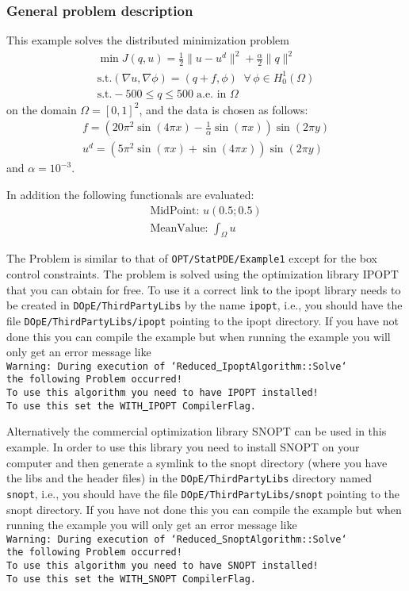 \subsubsection{General problem description}
This example solves the distributed minimization problem
\begin{gather*}
\min J(q,u) = \frac{1}{2} \|u-u^d\|^2 + \frac{\alpha}{2}\|q\|^2\\
\text{s.t.} (\nabla u,\nabla \phi) = (q+f,\phi)\;\;\forall\,\phi \in H^1_0(\Omega)\\
\text{s.t.} -500 \le q \le 500\;\text{a.e. in }\Omega
\end{gather*}
on the domain $\Omega = [0,1]^2$, and the data is chosen as follows:
\begin{gather*}
 f = \left(20\pi^2  \sin(4 \pi x) - \frac{1}{\alpha}  \sin(\pi x)\right) \sin(2 \pi y)\\
 u^d = \left( 5 \pi^2 \sin(\pi x) + \sin(4 \pi x)\right)  \sin(2\pi y)
\end{gather*}
and $\alpha = 10^{-3}$.

In addition the following functionals are evaluated:
\begin{gather*}
  \text{MidPoint: } u(0.5 ; 0.5)\\[2mm]
  \text{MeanValue: }\int_\Omega u
\end{gather*}

The Problem is similar to that of {\tt OPT/StatPDE/Example1} except for the box control constraints.
The problem is solved using the optimization library IPOPT that you can obtain for free. To use it 
a correct link to the ipopt library needs to be created in  {\tt DOpE/ThirdPartyLibs} by the name 
{\tt ipopt}, i.e., you should have the file
{\tt DOpE/ThirdPartyLibs/ipopt} pointing to the ipopt directory. If you have not done this you can compile the
example but when running the example you will only get an error message like\\
{\tt Warning: During execution of `Reduced\underline{ }IpoptAlgorithm::Solve`\\ the following Problem occurred!\\
To use this algorithm you need to have IPOPT installed! \\To use this set the WITH\underline{ }IPOPT CompilerFlag.}

Alternatively the commercial optimization library SNOPT can be used in this example.
In order to use this library you need to install SNOPT on your computer and then generate a symlink to 
the snopt directory (where you have the libs and the header files) 
in the {\tt DOpE/ThirdPartyLibs} directory named {\tt snopt}, i.e., you should have the file
{\tt DOpE/ThirdPartyLibs/snopt} pointing to the snopt directory. If you have not done this you can compile the
example but when running the example you will only get an error message like\\
{\tt Warning: During execution of `Reduced\underline{ }SnoptAlgorithm::Solve`\\ the following Problem occurred!\\
To use this algorithm you need to have SNOPT installed! \\To use this set the WITH\underline{ }SNOPT CompilerFlag.} 

